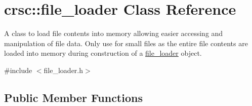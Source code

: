 \hypertarget{classcrsc_1_1file__loader}{}\section{crsc\+:\+:file\+\_\+loader Class Reference}
\label{classcrsc_1_1file__loader}


A class to load file contents into memory allowing easier accessing and manipulation of file data. Only use for small files as the entire file contents are loaded into memory during construction of a \hyperlink{classcrsc_1_1file__loader}{file\+\_\+loader} object.  




{\ttfamily \#include $<$file\+\_\+loader.\+h$>$}

\subsection*{Public Member Functions}
